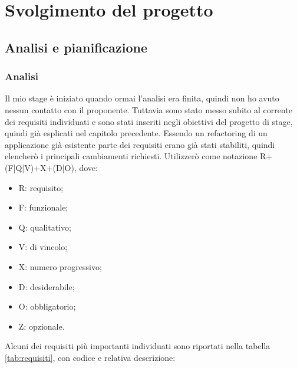 
\chapter{Svolgimento del progetto}
\label{cap:ilprogetto}


\section{Analisi e pianificazione}

\subsection{Analisi}
Il mio stage è iniziato quando ormai l'analisi era finita, quindi non ho avuto nessun contatto con il proponente. Tuttavia sono stato messo subito al corrente dei
requisiti individuati e sono stati inseriti negli obiettivi del progetto di stage, quindi già esplicati nel capitolo precedente. Essendo un refactoring di un applicazione
già esistente parte dei requisiti erano già stati stabiliti, quindi elencherò i principali cambiamenti richiesti. Utilizzerò come notazione R+(F|Q|V)+X+(D|O), dove:

\begin{itemize}
  \item R: requisito;
  \item F: funzionale;
  \item Q: qualitativo;
  \item V: di vincolo;
  \item X: numero progressivo;
  \item D: desiderabile;
  \item O: obbligatorio;
  \item Z: opzionale.
\end{itemize}

Alcuni dei requisiti più importanti individuati sono riportati nella tabella \autoref{tab:requisiti}, con codice e relativa descrizione:

